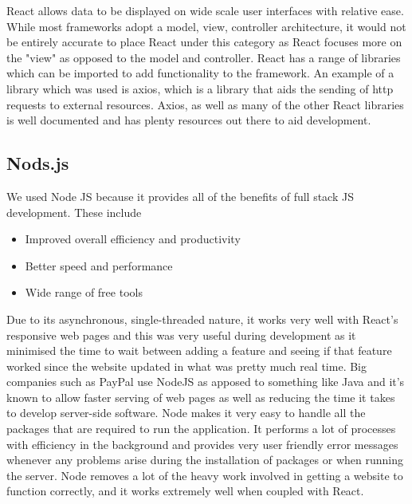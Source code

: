 \cite{IntroductionReact}React allows data to be displayed on wide scale user interfaces with relative ease. While most frameworks adopt a model, view, controller architecture, it would not be entirely accurate to place React under this category as React focuses more on the "view" as opposed to the model and controller. \newline
React has a range of libraries which can be imported to add functionality to the framework.\cite{Axios} An example of a library which was used is axios, which is a library that aids the sending of http requests to external resources. Axios, as well as many of the other React libraries is well documented and has plenty resources out there to aid development.

\subsection{Nods.js}
We used Node JS because it provides all of the benefits of \cite{fullStackJS}full stack JS development. These include

\begin{itemize}
    \item Improved overall efficiency and productivity
    \item Better speed and performance
    \item Wide range of free tools
\end{itemize}

Due to its asynchronous, single-threaded nature, it works very well with React's responsive web pages and this was very useful during development as it minimised the time to wait between adding a feature and seeing if that feature worked since the website updated in what was pretty much real time. \cite{PaypalNodeJS}Big companies such as PayPal use NodeJS as apposed to something like Java and it's known to allow faster serving of web pages as well as reducing the time it takes to develop server-side software.\newline
Node makes it very easy to handle all the packages that are required to run the application. It performs a lot of processes with efficiency in the background and provides very user friendly error messages whenever any problems arise during the installation of packages or when running the server. Node removes a lot of the heavy work involved in getting a website to function correctly, and it works extremely well when coupled with React.


